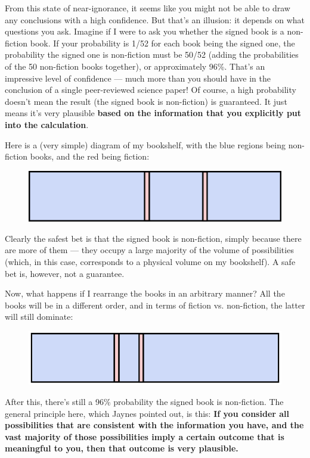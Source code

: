 \documentclass[a4paper, 12pt]{article}
\begin{document}
From this state of near-ignorance, it seems like you might not be able to draw
any conclusions with a high confidence. But that's an illusion: it depends on
what questions you ask. Imagine if I were to ask you whether the signed book
is a non-fiction book. If your probability is 1/52 for each book being the
signed one, the probability the signed one is non-fiction must be
50/52 (adding the probabilities of the 50 non-fiction books together), 
or approximately 96\%. That's an impressive level of confidence --- much more than you should have in the conclusion of a single peer-reviewed science paper!
Of course, a high probability doesn't mean the result (the signed book is
non-fiction) is guaranteed. It just means it's very plausible {\bf based on the
information that you explicitly put into the calculation}.

Here is a (very simple) diagram of my bookshelf, with the blue regions
being non-fiction books, and the red being fiction:
\begin{figure}[ht!]
\centering
\includegraphics{bookshelf.png}
\end{figure}
Clearly the safest bet is that the signed book is non-fiction, simply because
there are more of them --- they occupy a large majority of the volume of
possibilities (which, in this case, corresponds to a physical volume on my
bookshelf). A safe bet is, however, not a guarantee.

Now, what happens if I rearrange the books in an arbitrary manner? All the books
will be in a different order, and in terms of fiction vs. non-fiction, the
latter will still dominate:
\begin{figure}[ht!]
\centering
\includegraphics[scale=0.61]{bookshelf2.png}
\end{figure}
After this, there's still a 96\% probability the signed book is non-fiction.
The general principle here, which Jaynes pointed out, is this:
{\bf If you consider all possibilities that are consistent with
the information you have, and the vast majority of those possibilities
imply a certain outcome that is meaningful to you, then that outcome is very
plausible.}
\end{document}

